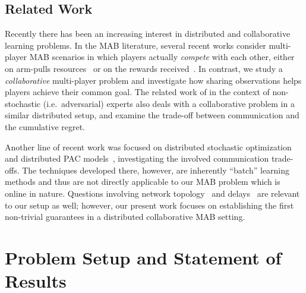\documentclass{article} %
\begin{document}
\subsection{Related Work}


Recently there has been an increasing interest in distributed and collaborative learning problems.
In the MAB literature, several recent works consider multi-player MAB scenarios in which players actually \emph{compete} with each other, either on arm-pulls resources~\cite{gabillon2011multi} or on the rewards received~\cite{liu2010distributed}.
In contrast, we study a \emph{collaborative} multi-player problem and investigate how sharing observations helps players achieve their common goal.
The related work of \citet{kanade2012distributed} in the context of non-stochastic (i.e.~adversarial) experts also deals with a collaborative problem in a similar distributed setup, and examine the trade-off between communication and the cumulative regret.

Another line of recent work was focused on distributed stochastic optimization~\cite{duchi2010distributed,agarwal2011delayed,dekel12} and distributed PAC models~\cite{balcan12,daume2012protocols,daume2012efficient}, investigating the involved communication trade-offs. 
The techniques developed there, however, are inherently ``batch'' learning methods and thus are not directly applicable to our MAB problem which is online in nature.
Questions involving network topology~\cite{duchi2010distributed,dekel12} and delays~\cite{agarwal2011delayed} are relevant to our setup as well; however, our present work focuses on establishing the first non-trivial guarantees in a distributed collaborative MAB setting.





\section{Problem Setup and Statement of Results}
\label{sec:prelims}
\end{document}
